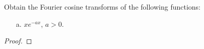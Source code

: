 \begin{problem}{2.14}
  Obtain the Fourier cosine transforms of the following functions:
  \begin{enumerate}
    \item[a.] $x e^{-a x}$, $a > 0$.
  \end{enumerate}
\end{problem}

\begin{proof}
\end{proof}
\newpage
